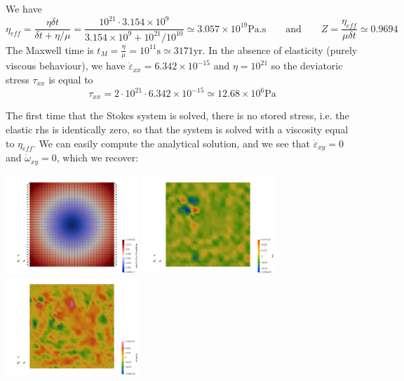 We have 
\[
\eta_{eff} 
= \frac{\eta \delta t}{\delta t + \eta/\mu} 
= \frac{10^{21} \cdot 3.154\times 10^{9}}{3.154\times 10^{9} + 10^{21}/10^{10}} 
\simeq 
3.057\times 10^{19}\text{Pa.s}
\qquad
\text{and}
\qquad
Z=\frac{\eta_{eff}}{\mu \delta t} 
\simeq 
0.9694
\]
The Maxwell time is $t_M = \frac{\eta}{\mu} = 10^{11}\text{s} \simeq 3171\text{yr}$.
In the absence of elasticity (purely viscous behaviour), we have 
$\dot{\varepsilon}_{xx} = 6.342\times 10^{-15}$ 
and $\eta=10^{21}$ so the 
deviatoric stress $\tau_{xx}$ is equal to 
\[
\tau_{xx} = 2 \cdot 10^{21} \cdot 6.342\times 10^{-15} \simeq 12.68 \times 10^6 \text{Pa}
\]

The first time that the Stokes system is solved, there is no stored stress, i.e. the 
elastic rhs is identically zero, so that the system is solved with a viscosity equal to
$\eta_{eff}$.
We can easily compute the analytical solution, and we see that $\dot{\varepsilon}_{xy}=0$
and $\dot{\omega}_{xy}=0$, which we recover:

\begin{center}
\includegraphics[width=5cm]{python_codes/fieldstone_64/results/buildup/init/vel}
\includegraphics[width=5cm]{python_codes/fieldstone_64/results/buildup/init/exy}
\includegraphics[width=5cm]{python_codes/fieldstone_64/results/buildup/init/oxy}
\end{center}

